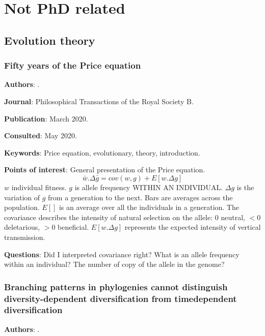 \documentclass[12pt,a4paper]{article}
\begin{document}
\newpage

\section*{Not PhD related}

\subsection*{Evolution theory}

\subsubsection*{Fifty years of the Price equation}

\textbf{Authors}: \cite{lethtonen2020price}.

\textbf{Journal}: Philosophical Transactions of the Royal Society B.

\textbf{Publication}: March 2020.

\textbf{Consulted}: May 2020.

\textbf{Keywords}: Price equation, evolutionary, theory, introduction.

\textbf{Points of interest}: General presentation of the Price equation.
\begin{equation}
\bar{w}.\Delta\bar{g} = cov(w,g) + E[w.\Delta g]
\end{equation}
$w$ individual fitness. $g$ is allele frequency WITHIN AN INDIVIDUAL. $\Delta{g}$ is the variation of $g$ from a generation to the next. Bars are averages across the population. $E[]$ is an average over all the individuals in a generation.
The covariance describes the intensity of natural selection on the allele: 0 neutral, $<0$ deletarious, $>0$ beneficial.
$E[w.\Delta g]$ represents the expected intensity of vertical transmission.

\textbf{Questions}: Did I interpreted covariance right? What is an allele frequency within an individual? The number of copy of the allele in the genome?

\newpage

\subsubsection*{Branching patterns in phylogenies cannot distinguish diversity-dependent diversification from timedependent diversification}

\textbf{Authors}: \cite{pannetier2020branching}.
\end{document}

